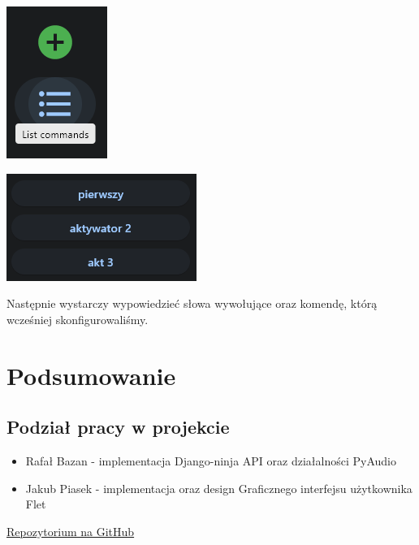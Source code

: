 \documentclass[polish]{article}
\begin{document}
        \begin{center}

          \includegraphics[scale=1.0]{screen4.png}

        \end{center}

        \begin{center}

          \includegraphics[scale=1.0]{screen5.png}

        \end{center}

        Następnie wystarczy wypowiedzieć słowa wywołujące oraz komendę, którą wcześniej skonfigurowaliśmy.



    \section{Podsumowanie}

        \subsection{Podział pracy w projekcie}

        \begin{itemize}

            \item Rafał Bazan - implementacja Django-ninja API oraz działalności PyAudio
            \item Jakub Piasek - implementacja oraz design Graficznego interfejsu użytkownika Flet

        \end{itemize}

    \href{https://github.com/bafaurazan/talk_bot}{Repozytorium na GitHub}
\end{document}
